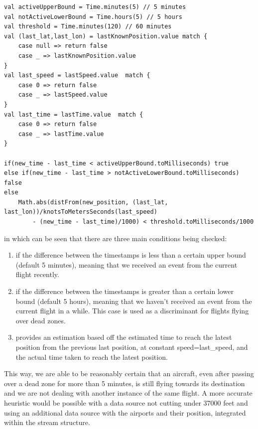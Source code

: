 \begin{verbatim}
val activeUpperBound = Time.minutes(5) // 5 minutes
val notActiveLowerBound = Time.hours(5) // 5 hours
val threshold = Time.minutes(120) // 60 minutes
val (last_lat,last_lon) = lastKnownPosition.value match {
    case null => return false
    case _ => lastKnownPosition.value
}
val last_speed = lastSpeed.value  match {
    case 0 => return false
    case _ => lastSpeed.value
}
val last_time = lastTime.value  match {
    case 0 => return false
    case _ => lastTime.value
}

if(new_time - last_time < activeUpperBound.toMilliseconds) true
else if(new_time - last_time > notActiveLowerBound.toMilliseconds) false
else
    Math.abs(distFrom(new_position, (last_lat, last_lon))/knotsToMetersSeconds(last_speed)
        - (new_time - last_time)/1000) < threshold.toMilliseconds/1000

\end{verbatim}

in which can be seen that there are three main conditions being checked:
\begin{enumerate}
    \item if the difference between the timestamps is less than a certain upper bound (default 5 minutes), meaning that we received an event from the current flight recently.
    \item if the difference between the timestamps is greater than a certain lower bound (default 5 hours), meaning that we haven't received an event from the current flight in a while. This case is used as a discriminant for flights flying over dead zones.
    \item provides an estimation based off the estimated time to reach the latest position from the previous last position, at constant speed=last\_speed, and the actual time taken to reach the latest position.
\end{enumerate}

This way, we are able to be reasonably certain that an aircraft, even after passing over a dead zone for more than 5 minutes, is still flying towards its destination and we are not dealing with another instance of the same flight. A more accurate heuristic would be possible with a data source not cutting under 37000 feet and using an additional data source with the airports and their position, integrated within the stream structure.

